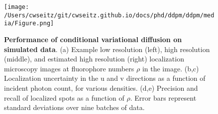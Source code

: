 

\begin{figure}[t]
\centering
\texttt{[image: /Users/cwseitz/git/cwseitz.github.io/docs/phd/ddpm/ddpm/media/Figure.png]}
\caption{\textbf{Performance of conditional variational diffusion on simulated data}. (a) Example low resolution (left), high resolution (middle), and estimated high resolution (right) localization microscopy images at fluorophore numbers $\rho$ in the image. (b,c) Localization uncertainty in the u and v directions as a function of incident photon count, for various densities. (d,e) Precision and recall of localized spots as a function of $\rho$. Error bars represent standard deviations over nine batches of data. }
\label{fig:cvdmsim}
\end{figure}



